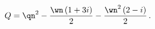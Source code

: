 \begin{equation}
 Q = \qn^2 - {\wn\, (1+ 3i)\over 2} - {\wn^2\, (2-i)\over 2} \,.
\label{vector_param_Q}
\end{equation}

